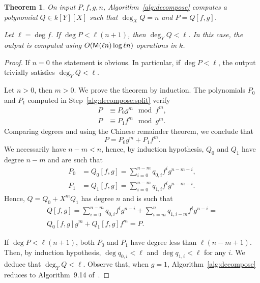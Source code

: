 \documentclass{sig-alternate}
\newtheorem{theorem}[definition]{Theorem}
\begin{document}
\begin{theorem}
  On input $P,f,g,n$, Algorithm~\ref{alg:decompose} computes a
  polynomial $Q\in k[Y][X]$ such that $\deg_X Q=n$ and $P=Q[f,g]$.

  Let $\ell=\deg f$. If $\deg P < \ell(n+1)$, then $\deg_Y Q<\ell$. In
  this case, the output is computed using $O(\mathsf{M}(\ell n)\log \ell
  n)$ operations in $k$.
\end{theorem}
\begin{proof}
  If $n=0$ the statement is obvious. In particular, if $\deg P <
  \ell$, the output trivially satisfies $\deg_YQ<\ell$.

  Let $n>0$, then $m>0$. We prove the theorem by induction. The
  polynomials $P_0$ and $P_1$ computed in
  Step~\ref{alg:decompose:split} verify
  \begin{equation}
    \begin{aligned}
      P &\equiv P_0g^m \mod f^m,\\
      P &\equiv P_1f^m \mod g^m.
    \end{aligned}
  \end{equation}
  Comparing degrees and using the Chinese remainder theorem, we
  conclude that
  \begin{equation}
    P = P_0g^m + P_1f^m.
  \end{equation}
  We necessarily have $n-m<n$, hence, by induction hypothesis, $Q_0$
  and $Q_1$ have degree $n-m$ and are such that
  \begin{equation}
    \begin{aligned}
      P_0 &= Q_0[f,g] = \sum_{i=0}^{n-m} q_{0,i}f^ig^{n-m-i},\\
      P_1 &= Q_1[f,g] = \sum_{i=0}^{n-m} q_{1,i}f^ig^{n-m-i}.
    \end{aligned}
  \end{equation}
  Hence, $Q=Q_0+X^mQ_1$ has degree $n$ and is such that
  \begin{multline}
    Q[f,g] = \sum_{i=0}^{n-m}q_{0,i}f^ig^{n-i} + 
    \sum_{i=m}^nq_{1,i-m}f^ig^{n-i} =\\
    Q_0[f,g]g^m + Q_1[f,g]f^m = P.
  \end{multline}

  If $\deg P < \ell (n+1)$, both $P_0$ and $P_1$ have degree less than
  $\ell(n-m+1)$. Then, by induction hypothesis, $\deg q_{0,i}<\ell$
  and $\deg q_{1,i}<\ell$ for any $i$. We deduce that
  $\deg_YQ<\ell$. Observe that, when $g=1$,
  Algorithm~\ref{alg:decompose} reduces to Algorithm~9.14
  of~\cite{vzGG}.


\end{proof}
\end{document}
